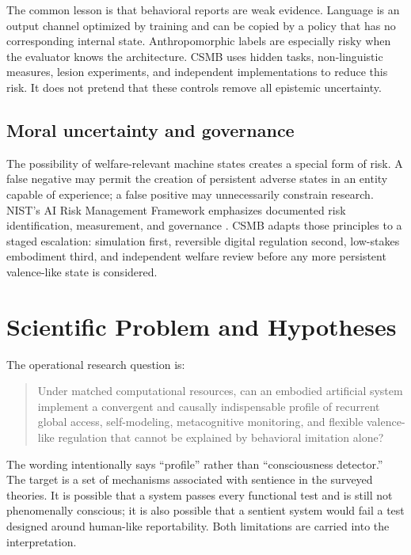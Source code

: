 \documentclass[conference]{IEEEtran}
\begin{document}
The common lesson is that behavioral reports are weak evidence. Language is an output channel optimized by training and can be copied by a policy that has no corresponding internal state. Anthropomorphic labels are especially risky when the evaluator knows the architecture. CSMB uses hidden tasks, non-linguistic measures, lesion experiments, and independent implementations to reduce this risk. It does not pretend that these controls remove all epistemic uncertainty.

\subsection{Moral uncertainty and governance}

The possibility of welfare-relevant machine states creates a special form of risk. A false negative may permit the creation of persistent adverse states in an entity capable of experience; a false positive may unnecessarily constrain research. NIST's AI Risk Management Framework emphasizes documented risk identification, measurement, and governance \cite{nist2023}. CSMB adapts those principles to a staged escalation: simulation first, reversible digital regulation second, low-stakes embodiment third, and independent welfare review before any more persistent valence-like state is considered.

\section{Scientific Problem and Hypotheses}

The operational research question is:

\begin{quote}
Under matched computational resources, can an embodied artificial system implement a convergent and causally indispensable profile of recurrent global access, self-modeling, metacognitive monitoring, and flexible valence-like regulation that cannot be explained by behavioral imitation alone?
\end{quote}

The wording intentionally says ``profile'' rather than ``consciousness detector.'' The target is a set of mechanisms associated with sentience in the surveyed theories. It is possible that a system passes every functional test and is still not phenomenally conscious; it is also possible that a sentient system would fail a test designed around human-like reportability. Both limitations are carried into the interpretation.
\end{document}
